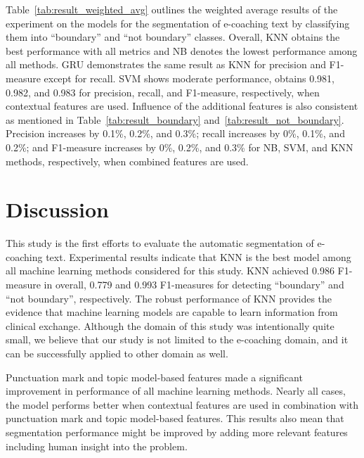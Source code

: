 \documentclass{amia}
\begin{document}
Table~\ref{tab:result_weighted_avg} outlines the weighted average results of the experiment on the models for the segmentation of e-coaching text by classifying them into ``boundary'' and ``not boundary'' classes. Overall, KNN obtains the best performance with all metrics and NB denotes the lowest performance among all methods. GRU demonstrates the same result as KNN for precision and F1-measure except for recall. SVM shows moderate performance, obtains 0.981, 0.982, and 0.983 for precision, recall, and F1-measure, respectively, when contextual features are used. Influence of the additional features is also consistent as mentioned in Table~\ref{tab:result_boundary} and~\ref{tab:result_not_boundary}. Precision increases by 0.1\%, 0.2\%, and 0.3\%; recall increases by 0\%, 0.1\%, and 0.2\%; and F1-measure increases by 0\%, 0.2\%, and 0.3\% for NB, SVM, and KNN methods, respectively, when combined features are used.\\

\section*{Discussion}
This study is the first efforts to evaluate the automatic segmentation of e-coaching text. Experimental results indicate that KNN is the best model among all machine learning methods considered for this study. KNN achieved 0.986 F1-measure in overall, 0.779 and 0.993 F1-measures for detecting ``boundary'' and ``not boundary'', respectively. The robust performance of KNN provides the evidence that machine learning models are capable to learn information from clinical exchange. Although the domain of this study was intentionally quite small, we believe that our study is not limited to the e-coaching domain, and it can be successfully applied to other domain as well.

Punctuation mark and topic model-based features made a significant improvement in performance of all machine learning methods. Nearly all cases, the model performs better when contextual features are used in combination with punctuation mark and topic model-based features. This results also mean that segmentation performance might be improved by adding more relevant features including human insight into the problem.       
\end{document}
